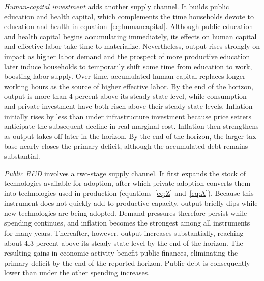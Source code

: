 \documentclass[a4paper,11pt]{article}
\begin{document}
\emph{Human-capital investment} adds another supply channel.
It builds public education and health capital, which complements the time households devote to education and health in equation~\eqref{eq:humancapital}.
Although public education and health capital begins accumulating immediately, its effects on human capital and effective labor take time to materialize.
Nevertheless, output rises strongly on impact as higher labor demand and the prospect of more productive education later induce households to temporarily shift some time from education to work, boosting labor supply.
Over time, accumulated human capital replaces longer working hours as the source of higher effective labor.
By the end of the horizon, output is more than 4 percent above its steady-state level, while consumption and private investment have both risen above their steady-state levels.
Inflation initially rises by less than under infrastructure investment because price setters anticipate the subsequent decline in real marginal cost.
Inflation then strengthens as output takes off later in the horizon.
By the end of the horizon, the larger tax base nearly closes the primary deficit, although the accumulated debt remains substantial.

\emph{Public R\&D} involves a two-stage supply channel.
It first expands the stock of technologies available for adoption, after which private adoption converts them into technologies used in production (equations~\ref{eq:Z} and~\ref{eq:A}).
Because this instrument does not quickly add to productive capacity, output briefly dips while new technologies are being adopted.
Demand pressures therefore persist while spending continues, and inflation becomes the strongest among all instruments for many years.
Thereafter, however, output increases substantially, reaching about 4.3 percent above its steady-state level by the end of the horizon.
The resulting gains in economic activity benefit public finances, eliminating the primary deficit by the end of the reported horizon.
Public debt is consequently lower than under the other spending increases.
\end{document}
